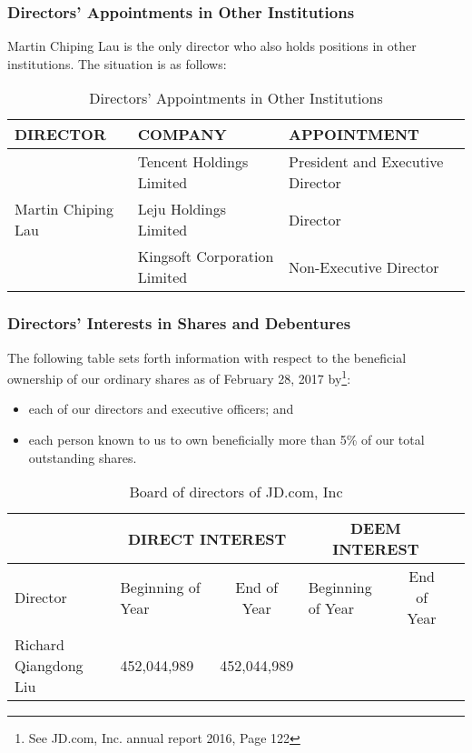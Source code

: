 \subsubsection{Directors’ Appointments in Other Institutions}
Martin Chiping Lau is the only director who also holds positions in other institutions.
The situation is as follows:

\begin{table}[H]	
	\begin{center}
		\begin{tabular}{ |l|l|l| }
			\hline
			\rowcolor[gray]{.95}
			\textbf{DIRECTOR}	& \textbf{COMPANY} &\textbf{APPOINTMENT} \\
			\hline
			 	            	& Tencent Holdings Limited & President and Executive Director\\			 	            	
			Martin Chiping Lau	& Leju Holdings Limited & Director \\
			 			        & Kingsoft Corporation Limited &Non-Executive Director \\
			\hline
		\end{tabular}
	\end{center}
	\caption{Directors’ Appointments in Other Institutions}\label{table:1}
\end{table}

\subsubsection{Directors’ Interests in Shares and Debentures}
The following table sets forth information with respect to the beneficial ownership of our ordinary shares as of February 28, 2017 by\footnote{See JD.com, Inc. annual report 2016, Page 122}:
\begin{itemize}
	\item each of our directors and executive officers; and
	\item each person known to us to own beneficially more than 5\% of our total outstanding shares.
\end{itemize}

\begin{table}[H]	
	\begin{center}
		\begin{tabular}{|l|p{2.05cm}|c|p{2.05cm}|c|c}\hline
			        &\multicolumn{2}{c|}{DIRECT INTEREST}&\multicolumn{2}{c|}{DEEM INTEREST}\\
			        \hline
			Director&Beginning of Year&End of Year&Beginning of Year&End of Year\\
			\hline
			Richard Qiangdong Liu&452,044,989&452,044,989& &\\
			\hline
		\end{tabular}
	\end{center}
	\caption{Board of directors of JD.com, Inc}\label{table:1}
\end{table}

